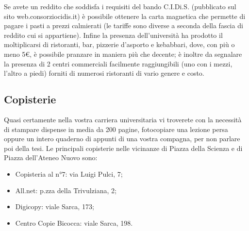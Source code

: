 Se avete un reddito che soddisfa i requisiti del bando C.I.Di.S. (pubblicato sul sito web.consorziocidis.it) è possibile ottenere la carta magnetica che permette di pagare i pasti a prezzi calmierati (le tariffe sono diverse a seconda della fascia di reddito cui si appartiene).
Infine la presenza dell'università ha prodotto il moltiplicarsi di ristoranti, bar, pizzerie d'asporto e kebabbari, dove, con più o meno 5€, è possibile pranzare in maniera più che decente; è inoltre da segnalare la presenza di 2 centri commerciali facilmente raggiungibili (uno con i mezzi, l'altro a piedi) forniti di numerosi ristoranti di vario genere e costo.

\subsection{Copisterie}
Quasi certamente nella vostra carriera universitaria vi troverete con la necessità di stampare dispense in media da 200 pagine, fotocopiare una lezione persa oppure un intero quaderno di appunti di una vostra compagna, per non parlare poi della tesi. Le principali copisterie nelle vicinanze di Piazza della Scienza e di Piazza dell'Ateneo Nuovo sono:
\begin{itemize}
\item Copisteria al n°7: via Luigi Pulci, 7;
\item All.net: p.zza della Trivulziana, 2;
\item Digicopy: viale Sarca, 173;
\item Centro Copie Bicocca: viale Sarca, 198.
\end{itemize}
